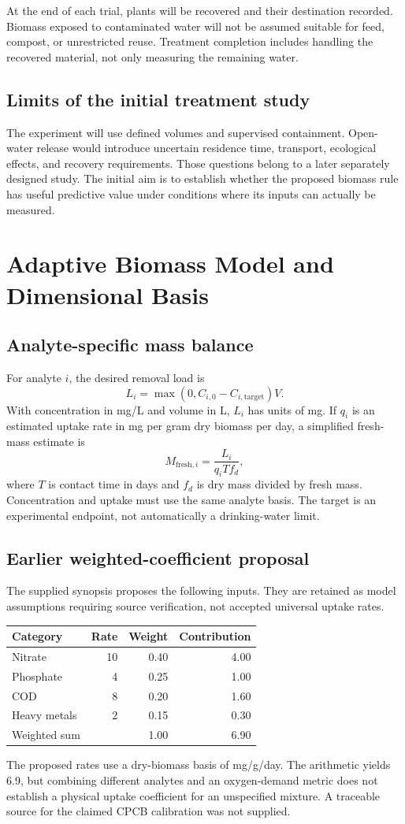 \documentclass[12pt,a4paper]{article}
\newcommand{\papersection}[1]{\clearpage\section{#1}}
\begin{document}
At the end of each trial, plants will be recovered and their destination recorded. Biomass exposed to contaminated water will not be assumed suitable for feed, compost, or unrestricted reuse. Treatment completion includes handling the recovered material, not only measuring the remaining water.

\subsection{Limits of the initial treatment study}
The experiment will use defined volumes and supervised containment. Open-water release would introduce uncertain residence time, transport, ecological effects, and recovery requirements. Those questions belong to a later separately designed study. The initial aim is to establish whether the proposed biomass rule has useful predictive value under conditions where its inputs can actually be measured.

\papersection{Adaptive Biomass Model and Dimensional Basis}
\subsection{Analyte-specific mass balance}
For analyte $i$, the desired removal load is
\[
L_i=\max(0,C_{i,0}-C_{i,\mathrm{target}})V.
\]
With concentration in mg/L and volume in L, $L_i$ has units of mg. If $q_i$ is an estimated uptake rate in mg per gram dry biomass per day, a simplified fresh-mass estimate is
\begin{equation}
M_{\mathrm{fresh},i}=\frac{L_i}{q_iT f_d},
\label{eq:biomass}
\end{equation}
where $T$ is contact time in days and $f_d$ is dry mass divided by fresh mass. Concentration and uptake must use the same analyte basis. The target is an experimental endpoint, not automatically a drinking-water limit.

\subsection{Earlier weighted-coefficient proposal}
The supplied synopsis proposes the following inputs. They are retained as model assumptions requiring source verification, not accepted universal uptake rates.
\begin{center}\small
\begin{tabular}{lrrr}
\toprule Category & Rate & Weight & Contribution\\\midrule
Nitrate & 10 & 0.40 & 4.00\\
Phosphate & 4 & 0.25 & 1.00\\
COD & 8 & 0.20 & 1.60\\
Heavy metals & 2 & 0.15 & 0.30\\\midrule
Weighted sum & & 1.00 & 6.90\\\bottomrule
\end{tabular}\end{center}
The proposed rates use a dry-biomass basis of mg/g/day. The arithmetic yields 6.9, but combining different analytes and an oxygen-demand metric does not establish a physical uptake coefficient for an unspecified mixture. A traceable source for the claimed CPCB calibration was not supplied.
\end{document}
